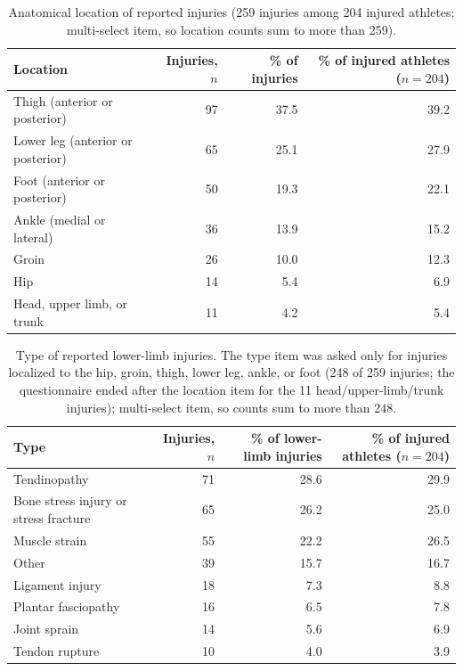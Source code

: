 \begin{table}[htbp]
\centering
\footnotesize
\caption{Anatomical location of reported injuries (259 injuries among 204 injured athletes; multi-select item, so location counts sum to more than 259).}
\label{tab:injury-location}
\begin{tabular}{lrrr}
\toprule
Location & Injuries, $n$ & \% of injuries & \% of injured athletes ($n=204$) \\
\midrule
Thigh (anterior or posterior) & 97 & 37.5 & 39.2 \\
Lower leg (anterior or posterior) & 65 & 25.1 & 27.9 \\
Foot (anterior or posterior) & 50 & 19.3 & 22.1 \\
Ankle (medial or lateral) & 36 & 13.9 & 15.2 \\
Groin & 26 & 10.0 & 12.3 \\
Hip & 14 & 5.4 & 6.9 \\
Head, upper limb, or trunk & 11 & 4.2 & 5.4 \\
\bottomrule
\end{tabular}
\end{table}

\begin{table}[htbp]
\centering
\footnotesize
\caption{Type of reported lower-limb injuries. The type item was asked only for injuries localized to the hip, groin, thigh, lower leg, ankle, or foot (248 of 259 injuries; the questionnaire ended after the location item for the 11 head/upper-limb/trunk injuries); multi-select item, so counts sum to more than 248.}
\label{tab:injury-type}
\begin{tabular}{lrrr}
\toprule
Type & Injuries, $n$ & \% of lower-limb injuries & \% of injured athletes ($n=204$) \\
\midrule
Tendinopathy & 71 & 28.6 & 29.9 \\
Bone stress injury or stress fracture & 65 & 26.2 & 25.0 \\
Muscle strain & 55 & 22.2 & 26.5 \\
Other & 39 & 15.7 & 16.7 \\
Ligament injury & 18 & 7.3 & 8.8 \\
Plantar fasciopathy & 16 & 6.5 & 7.8 \\
Joint sprain & 14 & 5.6 & 6.9 \\
Tendon rupture & 10 & 4.0 & 3.9 \\
\bottomrule
\end{tabular}
\end{table}
